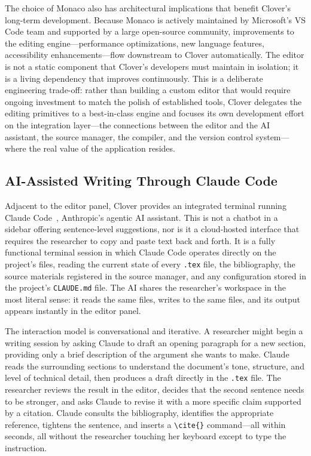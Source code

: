 \documentclass[a4paper,11pt]{article}
\begin{document}
The choice of Monaco also has architectural implications that benefit Clover's long-term development. Because Monaco is actively maintained by Microsoft's VS Code team and supported by a large open-source community, improvements to the editing engine---performance optimizations, new language features, accessibility enhancements---flow downstream to Clover automatically. The editor is not a static component that Clover's developers must maintain in isolation; it is a living dependency that improves continuously. This is a deliberate engineering trade-off: rather than building a custom editor that would require ongoing investment to match the polish of established tools, Clover delegates the editing primitives to a best-in-class engine and focuses its own development effort on the integration layer---the connections between the editor and the AI assistant, the source manager, the compiler, and the version control system---where the real value of the application resides.

\subsection{AI-Assisted Writing Through Claude Code}

Adjacent to the editor panel, Clover provides an integrated terminal running Claude Code~\cite{ClaudeCode}, Anthropic's agentic AI assistant. This is not a chatbot in a sidebar offering sentence-level suggestions, nor is it a cloud-hosted interface that requires the researcher to copy and paste text back and forth. It is a fully functional terminal session in which Claude Code operates directly on the project's files, reading the current state of every \texttt{.tex} file, the bibliography, the source materials registered in the source manager, and any configuration stored in the project's \texttt{CLAUDE.md} file. The AI shares the researcher's workspace in the most literal sense: it reads the same files, writes to the same files, and its output appears instantly in the editor panel.

The interaction model is conversational and iterative. A researcher might begin a writing session by asking Claude to draft an opening paragraph for a new section, providing only a brief description of the argument she wants to make. Claude reads the surrounding sections to understand the document's tone, structure, and level of technical detail, then produces a draft directly in the \texttt{.tex} file. The researcher reviews the result in the editor, decides that the second sentence needs to be stronger, and asks Claude to revise it with a more specific claim supported by a citation. Claude consults the bibliography, identifies the appropriate reference, tightens the sentence, and inserts a \texttt{\textbackslash cite\{\}} command---all within seconds, all without the researcher touching her keyboard except to type the instruction.
\end{document}

